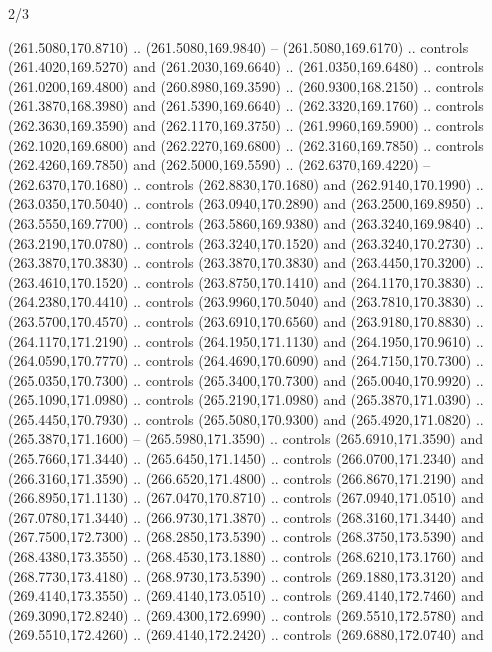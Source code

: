 \begin{flagdescription}{2/3}
\begin{scope}[xshift=0.5\flaglength,yshift=0.5\flagwidth,scale=\flagwidth/259.2]
\begin{scope}[y=0.8pt, x=0.8pt, yscale=-1,shift={(-243,-162)}]
      (261.5080,170.8710) .. (261.5080,169.9840) -- (261.5080,169.6170) .. controls
      (261.4020,169.5270) and (261.2030,169.6640) .. (261.0350,169.6480) .. controls
      (261.0200,169.4800) and (260.8980,169.3590) .. (260.9300,168.2150) .. controls
      (261.3870,168.3980) and (261.5390,169.6640) .. (262.3320,169.1760) .. controls
      (262.3630,169.3590) and (262.1170,169.3750) .. (261.9960,169.5900) .. controls
      (262.1020,169.6800) and (262.2270,169.6800) .. (262.3160,169.7850) .. controls
      (262.4260,169.7850) and (262.5000,169.5590) .. (262.6370,169.4220) --
      (262.6370,170.1680) .. controls (262.8830,170.1680) and (262.9140,170.1990) ..
      (263.0350,170.5040) .. controls (263.0940,170.2890) and (263.2500,169.8950) ..
      (263.5550,169.7700) .. controls (263.5860,169.9380) and (263.3240,169.9840) ..
      (263.2190,170.0780) .. controls (263.3240,170.1520) and (263.3240,170.2730) ..
      (263.3870,170.3830) .. controls (263.3870,170.3830) and (263.4450,170.3200) ..
      (263.4610,170.1520) .. controls (263.8750,170.1410) and (264.1170,170.3830) ..
      (264.2380,170.4410) .. controls (263.9960,170.5040) and (263.7810,170.3830) ..
      (263.5700,170.4570) .. controls (263.6910,170.6560) and (263.9180,170.8830) ..
      (264.1170,171.2190) .. controls (264.1950,171.1130) and (264.1950,170.9610) ..
      (264.0590,170.7770) .. controls (264.4690,170.6090) and (264.7150,170.7300) ..
      (265.0350,170.7300) .. controls (265.3400,170.7300) and (265.0040,170.9920) ..
      (265.1090,171.0980) .. controls (265.2190,171.0980) and (265.3870,171.0390) ..
      (265.4450,170.7930) .. controls (265.5080,170.9300) and (265.4920,171.0820) ..
      (265.3870,171.1600) -- (265.5980,171.3590) .. controls (265.6910,171.3590) and
      (265.7660,171.3440) .. (265.6450,171.1450) .. controls (266.0700,171.2340) and
      (266.3160,171.3590) .. (266.6520,171.4800) .. controls (266.8670,171.2190) and
      (266.8950,171.1130) .. (267.0470,170.8710) .. controls (267.0940,171.0510) and
      (267.0780,171.3440) .. (266.9730,171.3870) .. controls (268.3160,171.3440) and
      (267.7500,172.7300) .. (268.2850,173.5390) .. controls (268.3750,173.5390) and
      (268.4380,173.3550) .. (268.4530,173.1880) .. controls (268.6210,173.1760) and
      (268.7730,173.4180) .. (268.9730,173.5390) .. controls (269.1880,173.3120) and
      (269.4140,173.3550) .. (269.4140,173.0510) .. controls (269.4140,172.7460) and
      (269.3090,172.8240) .. (269.4300,172.6990) .. controls (269.5510,172.5780) and
      (269.5510,172.4260) .. (269.4140,172.2420) .. controls (269.6880,172.0740) and

\end{scope}
\end{scope}
\end{flagdescription}
